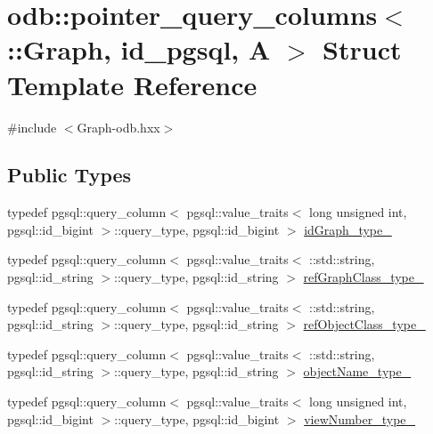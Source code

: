 \hypertarget{structodb_1_1pointer__query__columns_3_01_1_1_graph_00_01id__pgsql_00_01_a_01_4}{}\section{odb\+:\+:pointer\+\_\+query\+\_\+columns$<$ \+:\+:Graph, id\+\_\+pgsql, A $>$ Struct Template Reference}
\label{structodb_1_1pointer__query__columns_3_01_1_1_graph_00_01id__pgsql_00_01_a_01_4}


{\ttfamily \#include $<$Graph-\/odb.\+hxx$>$}

\subsection*{Public Types}
\begin{DoxyCompactItemize}
\item 
typedef pgsql\+::query\+\_\+column$<$ pgsql\+::value\+\_\+traits$<$ long unsigned int, pgsql\+::id\+\_\+bigint $>$\+::query\+\_\+type, pgsql\+::id\+\_\+bigint $>$ \hyperlink{structodb_1_1pointer__query__columns_3_01_1_1_graph_00_01id__pgsql_00_01_a_01_4_a952f08becd331e59532291cfb4dcd7b5}{id\+Graph\+\_\+type\+\_\+}
\item 
typedef pgsql\+::query\+\_\+column$<$ pgsql\+::value\+\_\+traits$<$ \+::std\+::string, pgsql\+::id\+\_\+string $>$\+::query\+\_\+type, pgsql\+::id\+\_\+string $>$ \hyperlink{structodb_1_1pointer__query__columns_3_01_1_1_graph_00_01id__pgsql_00_01_a_01_4_a8a225606c1afca01500d85c3ce13373e}{ref\+Graph\+Class\+\_\+type\+\_\+}
\item 
typedef pgsql\+::query\+\_\+column$<$ pgsql\+::value\+\_\+traits$<$ \+::std\+::string, pgsql\+::id\+\_\+string $>$\+::query\+\_\+type, pgsql\+::id\+\_\+string $>$ \hyperlink{structodb_1_1pointer__query__columns_3_01_1_1_graph_00_01id__pgsql_00_01_a_01_4_aecdd17603790aef184886a67add4e165}{ref\+Object\+Class\+\_\+type\+\_\+}
\item 
typedef pgsql\+::query\+\_\+column$<$ pgsql\+::value\+\_\+traits$<$ \+::std\+::string, pgsql\+::id\+\_\+string $>$\+::query\+\_\+type, pgsql\+::id\+\_\+string $>$ \hyperlink{structodb_1_1pointer__query__columns_3_01_1_1_graph_00_01id__pgsql_00_01_a_01_4_a7f15e44218d9dca730884cbfe432ae38}{object\+Name\+\_\+type\+\_\+}
\item 
typedef pgsql\+::query\+\_\+column$<$ pgsql\+::value\+\_\+traits$<$ long unsigned int, pgsql\+::id\+\_\+bigint $>$\+::query\+\_\+type, pgsql\+::id\+\_\+bigint $>$ \hyperlink{structodb_1_1pointer__query__columns_3_01_1_1_graph_00_01id__pgsql_00_01_a_01_4_a743751e03ccf0b484c4cc6a007ce1bfa}{view\+Number\+\_\+type\+\_\+}
\end{DoxyCompactItemize}
